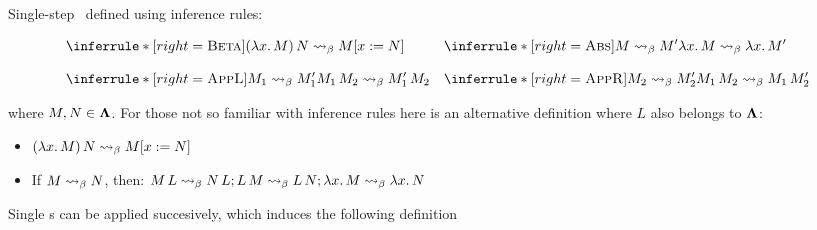 \documentclass[12pt]{book}
\newcommand{\subst}[2]{[#1 := #2]}    %
\newcommand{\step}{\curly} %
\newcommand{\lam}[2]{\lambda #1.\,#2} %
\begin{document}
\begin{definition} Single-step \bred \ defined using inference rules: 
  \label{def:single-step-betared}
  \begin{center}
    \[
      \begin{aligned}
        &\inferrule*[right=\textsc{Beta}]
          { }
          { (\lam{x}{M})\,N \step M\subst{x}{N} } \\[2ex]
        &\inferrule*[right=\textsc{AppL}]
          { M_1 \step M_1' }
          { M_1\,M_2 \step M_1'\,M_2 }
      \end{aligned}
      \quad
      \begin{aligned}
        &\inferrule*[right=\textsc{Abs}]
          { M \step M' }
          { \lam{x}{M} \step \lam{x}{M'} } \\[2ex]
        &\inferrule*[right=\textsc{AppR}]
          { M_2 \step M_2' }
          { M_1\,M_2 \step M_1\,M_2' }
      \end{aligned}
    \]
  \end{center}
  where \( M, N \in \mathbf{\Lambda} \).
  For those not so familiar with inference rules here is an alternative definition where $L$ also belongs to $\mathbf{\Lambda}$:
\end{definition}
\begin{itemize}
  \item \( (\lam{x}{M})\,N \step M\subst{x}{N} \)
  \item If $M \step N$, then: \( M\,L \step N\,L; L\,M \step L\,N; \lam{x}{M} \step \lam{x}{N} \)
\end{itemize}

Single \bred s can be applied succesively, which induces the following definition
\end{document}
